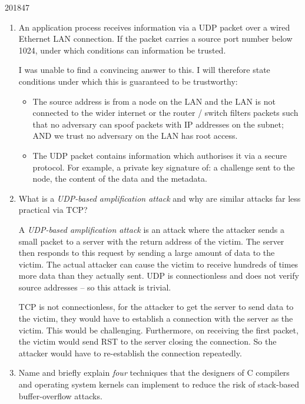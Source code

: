 \documentclass[10pt,\jkfside,a4paper]{article}
\begin{document}
\begin{examquestion}{2018}{4}{7}

\begin{enumerate}

\item An application process receives information via a UDP packet over a
wired Ethernet LAN connection. If the packet carries a source port number
below 1024, under which conditions can information be trusted.

I was unable to find a convincing answer to this. I will therefore state
conditions under which this is guaranteed to be trustworthy:

\begin{itemize}

\item The source address is from a node on the LAN and the LAN is not connected
to the wider internet or the router / switch filters packets such that no
adversary can spoof packets with IP addresses on the subnet; AND we trust
no adversary on the LAN has root access.

\item The UDP packet contains information which authorises it via a secure
protocol. For example, a private key signature of: a challenge sent to the
node, the content of the data and the metadata.

\end{itemize}

\item What is a \textit{UDP-based amplification attack} and why are similar
attacks far less practical via TCP?

A \textit{UDP-based amplification attack} is an attack where the attacker
sends a small packet to a server with the return address of the victim. The
server then responds to this request by sending a large amount of data to
the victim. The actual attacker can cause the victim to receive hundreds of
times more data than they actually sent. UDP is connectionless and does not
verify source addresses -- so this attack is trivial.

TCP is not connectionless, for the attacker to get the server to send data
to the victim, they would have to establish a connection with the server as
the victim. This would be challenging. Furthermore, on receiving the first
packet, the victim would send RST to the server closing the connection. So
the attacker would have to re-establish the connection repeatedly.

\item Name and briefly explain \textit{four} techniques that the designers
of C compilers and operating system kernels can implement to reduce the risk
of stack-based buffer-overflow attacks.


\end{enumerate}
\end{examquestion}
\end{document}
